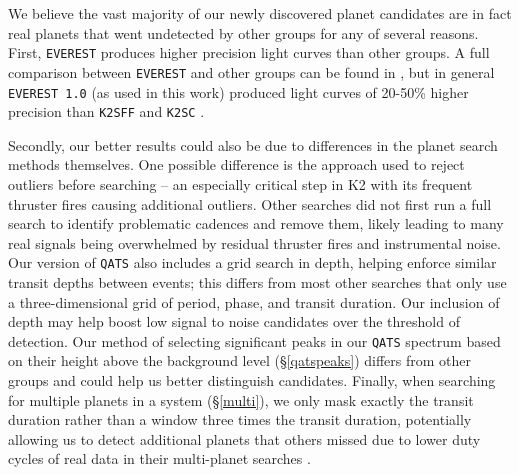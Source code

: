 \documentclass[twocolumn]{aastex62}
\newcommand{\pipeline}[1]{\texttt{#1}}
\begin{document}
We believe the vast majority of our newly discovered planet candidates
are in fact real planets that went undetected by other groups for any
of several reasons.  First, \pipeline{EVEREST} produces higher
precision light curves than other groups. A full comparison between
\pipeline{EVEREST} and other groups can be found in \cite{lug16}, but
in general \pipeline{EVEREST 1.0} (as used in this work) produced
light curves of 20-50\% higher precision than \pipeline{K2SFF}
\citep{van14} and \pipeline{K2SC} \citep{aig16}.

Secondly, our better results could also be due to differences in the
planet search methods themselves. One possible difference is the
approach used to reject outliers before searching -- an especially
critical step in K2 with its frequent thruster fires causing
additional outliers. Other searches did not first run a full search to
identify problematic cadences and remove them, likely leading to many
real signals being overwhelmed by residual thruster fires and
instrumental noise. Our version of \pipeline{QATS} also includes a
grid search in depth, helping enforce similar transit depths between
events; this differs from most other searches that only use a
three-dimensional grid of period, phase, and transit duration. Our
inclusion of depth may help boost low signal to noise candidates over
the threshold of detection. Our method of selecting significant peaks
in our \pipeline{QATS} spectrum based on their height above the
background level (\S\ref{qatspeaks}) differs from other groups and
could help us better distinguish candidates.  Finally, when searching
for multiple planets in a system (\S\ref{multi}), we only mask exactly
the transit duration rather than a window three times the transit
duration, potentially allowing us to detect additional planets that
others missed due to lower duty cycles of real data in their
multi-planet searches \citep{zin19}.
\end{document}
